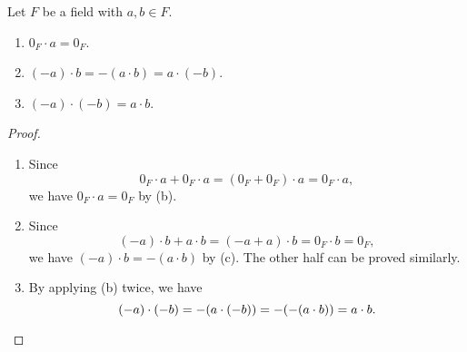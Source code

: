 \begin{proposition}\label{prop:field-operation}
  Let $F$ be a field with $a, b \in F$.
  \begin{enumerate}
    \item $0_F \cdot a = 0_F$.
    \item $(-a) \cdot b = -(a \cdot b) = a \cdot (-b)$.
    \item $(-a) \cdot (-b) = a \cdot b$.
  \end{enumerate}
\end{proposition}
\begin{proof} \leavevmode
  \begin{enumerate}
    \item Since
      \begin{equation*}
        0_F \cdot a + 0_F \cdot a
        = (0_F + 0_F) \cdot a
        = 0_F \cdot a,
      \end{equation*}
      we have $0_F \cdot a = 0_F$ by  (b).
    \item Since
      \begin{equation*}
        (-a) \cdot b + a \cdot b
        = (-a + a) \cdot b
        = 0_F \cdot b
        = 0_F,
      \end{equation*}
      we have $(-a) \cdot b = -(a \cdot b)$ by  (c).
      The other half can be proved similarly.
    \item By applying (b) twice, we have
      \begin{equation*}
        (-a) \cdot (-b)
        = -(a \cdot (-b))
        = -(-(a \cdot b))
        = a \cdot b. \qedhere
      \end{equation*}
  \end{enumerate}
\end{proof}

